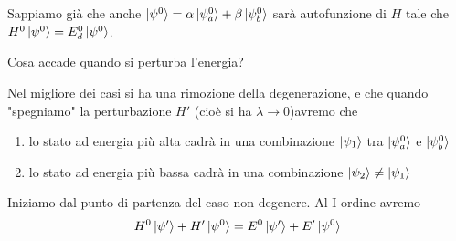Sappiamo già che anche $\ket{\psi^0}= \alpha \ket{\psi^0_a} + \beta \ket{\psi^0_b}$ sarà autofunzione di $H$ tale che $H^0\ket{\psi^0}=E_d^0\ket{\psi^0}$.

Cosa accade quando si perturba l'energia?

Nel migliore dei casi si ha una rimozione della degenerazione, e che quando "spegniamo" la perturbazione $H'$ (cioè si ha $\lambda \rightarrow 0$)avremo che
\begin{enumerate}
	\item lo stato ad energia più alta cadrà in una combinazione $\ket{\psi_1}$ tra $\ket{\psi^0_a}$ e $\ket{\psi^0_b}$
	\item lo stato ad energia più bassa cadrà in una combinazione
	$\ket{\psi_2}\neq \ket{\psi_1}$
\end{enumerate} 

Iniziamo dal punto di partenza del caso non degenere. Al I ordine avremo
\begin{align}
H^0\ket{\psi'} + H'\ket{\psi^0}=E^0\ket{\psi'} + E'\ket{\psi^0}
\end{align}

